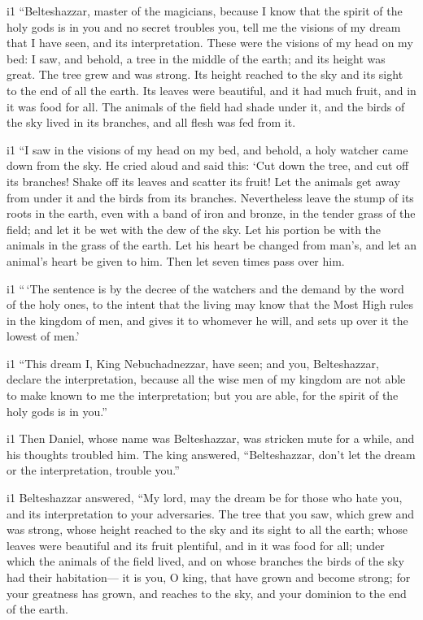 i1  ``Belteshazzar, master of the magicians, because I
know that the spirit of the holy gods is in you and no secret troubles
you, tell me the visions of my dream that I have seen, and its
interpretation.  These were the visions of my head on my
bed: I saw, and behold, a tree in the middle of the earth; and its
height was great.  The tree grew and was strong. Its
height reached to the sky and its sight to the end of all the earth.
 Its leaves were beautiful, and it had much fruit, and in
it was food for all. The animals of the field had shade under it, and
the birds of the sky lived in its branches, and all flesh was fed from
it.

i1  ``I saw in the visions of my head on my bed, and
behold, a holy watcher came down from the sky.  He cried
aloud and said this: `Cut down the tree, and cut off its branches! Shake
off its leaves and scatter its fruit! Let the animals get away from
under it and the birds from its branches.  Nevertheless
leave the stump of its roots in the earth, even with a band of iron and
bronze, in the tender grass of the field; and let it be wet with the dew
of the sky. Let his portion be with the animals in the grass of the
earth.  Let his heart be changed from man's, and let an
animal's heart be given to him. Then let seven times pass over him.

i1  ``\,`The sentence is by the decree of the watchers
and the demand by the word of the holy ones, to the intent that the
living may know that the Most High rules in the kingdom of men, and
gives it to whomever he will, and sets up over it the lowest of men.'

i1  ``This dream I, King Nebuchadnezzar, have seen; and
you, Belteshazzar, declare the interpretation, because all the wise men
of my kingdom are not able to make known to me the interpretation; but
you are able, for the spirit of the holy gods is in you.''

i1  Then Daniel, whose name was Belteshazzar, was
stricken mute for a while, and his thoughts troubled him. The king
answered, ``Belteshazzar, don't let the dream or the interpretation,
trouble you.''

i1 Belteshazzar answered, ``My lord, may the dream be for those who hate
you, and its interpretation to your adversaries.  The
tree that you saw, which grew and was strong, whose height reached to
the sky and its sight to all the earth;  whose leaves
were beautiful and its fruit plentiful, and in it was food for all;
under which the animals of the field lived, and on whose branches the
birds of the sky had their habitation---  it is you, O
king, that have grown and become strong; for your greatness has grown,
and reaches to the sky, and your dominion to the end of the earth.

